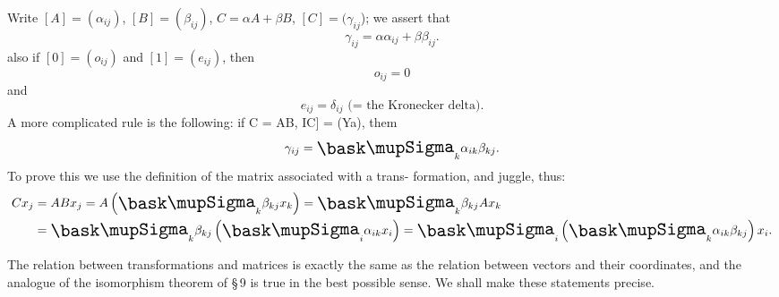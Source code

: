 Write \([A] = (\alpha_{ij})\), \([B] = (\beta_{ij})\), \(C = \alpha A + \beta B\), \([C] = (\gamma_{ij}\)); we assert that
\begin{equation*}
    \gamma_{ij} = \alpha \alpha_{ij} + \beta \beta_{ij}.
\end{equation*}
also if \([0] = (o_{ij})\) and \([1] = (e_{ij})\), then
\begin{equation*}
    o_{ij} = 0
\end{equation*}
and
\begin{equation*}
    e_{ij} = \delta_{ij}\text{ (= the Kronecker delta)}.
\end{equation*}
A more complicated rule is the following: if C = AB, IC] = (Ya), them
\begin{equation*}
    \gamma_{ij} = {\textstyle \sumx_k} \alpha_{ik} \beta_{kj}.
\end{equation*}
To prove this we use the definition of the matrix associated with a trans- formation, and juggle, thus:
\begin{align*}
    Cx_j & = ABx_j = A\left({\textstyle \sumx_k} \beta_{kj} x_k\right) = {\textstyle \sumx_k} \beta_{kj} Ax_k \\
    & = {\textstyle \sumx_k} \beta_{kj} \left({\textstyle \sumx_i} \alpha_{ik} x_i\right) = {\textstyle \sumx_i} \left({\textstyle \sumx_k} \alpha_{ik} \beta_{kj} \right) x_i.
\end{align*}

The relation between transformations and matrices is exactly the same as the
relation between vectors and their coordinates, and the analogue of the
isomorphism theorem of \S\,9 is true in the best possible sense. We shall make
these statements precise.

